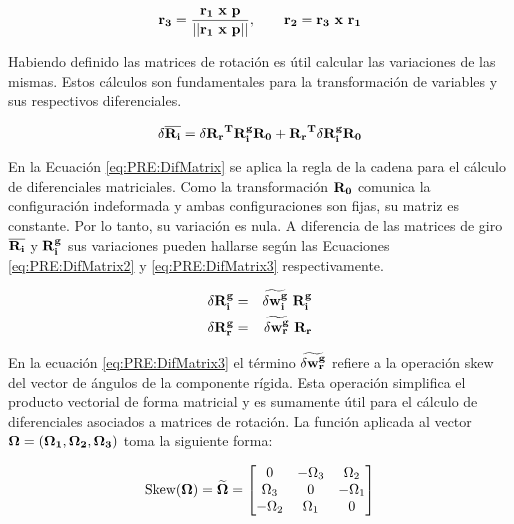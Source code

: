 \begin{equation}\label{Eqn:Corrot:VectorsR}
	\bf{r}_3=\frac{\bf{r_1}~x~\bf{p}}{||\bf{r_1}~x~\bf{p}||},~~~~~~\bf{r_2}=\bf{r_3}~x~\bf{r_1}
\end{equation}


Habiendo definido las matrices de rotación  es útil calcular las variaciones de las mismas. Estos cálculos son fundamentales para la transformación de variables y sus respectivos diferenciales. 

\begin{equation}\label{eq:PRE:DifMatrix}
	\delta \overline{\bf{R_i}}=\delta\bf{R_r}^T\bf{R_i^g}\bf{R_0}+\bf{R_r}^T\delta \bf{R_i^g}\bf{R_0}
\end{equation}

En la Ecuación \eqref{eq:PRE:DifMatrix} se aplica la regla de la cadena para el cálculo de diferenciales matriciales. Como la transformación $\bf{R_0}$ comunica la configuración indeformada y ambas configuraciones son fijas, su matriz es constante. Por lo tanto, su variación es nula. A diferencia de las matrices de giro $\overline{\bf{R_i}}$ y $ \bf{R_i^g}$ sus variaciones pueden hallarse según las Ecuaciones \eqref{eq:PRE:DifMatrix2} y \eqref{eq:PRE:DifMatrix3} respectivamente.


\begin{eqnarray}
	\label{eq:PRE:DifMatrix2}
	\delta \bf{R_i^g} &=& \widetilde{\delta\bf{w}_i^g}~\bf{R}_i^g\\
	\label{eq:PRE:DifMatrix3}
	\delta \bf{R_r^g} &=& \widetilde{\delta\bf{w}_r^g}~\bf{R}_r
\end{eqnarray}

En la ecuación \eqref{eq:PRE:DifMatrix3} el término $\widetilde{\delta\bf{w}_r^g}$ refiere a la operación skew del vector de ángulos de la componente rígida. Esta operación simplifica el producto vectorial de forma matricial y es sumamente útil para el cálculo de diferenciales asociados a matrices de rotación. La función aplicada al vector $\bf{\Omega}=(\Omega_1,\Omega_2,\Omega_3)$ toma la siguiente forma:

\begin{equation}\label{eq:PRE:Skew}
	\text{Skew}(\bf{\Omega})=\widetilde{\bf{\Omega}}
	= 
	\begin{bmatrix}
		0 &-\Omega_3  &\Omega_2   \\ 
		\Omega_3&0  & -\Omega_1  \\ 
		-\Omega_2  & \Omega_1 & 0
	\end{bmatrix}
\end{equation}

